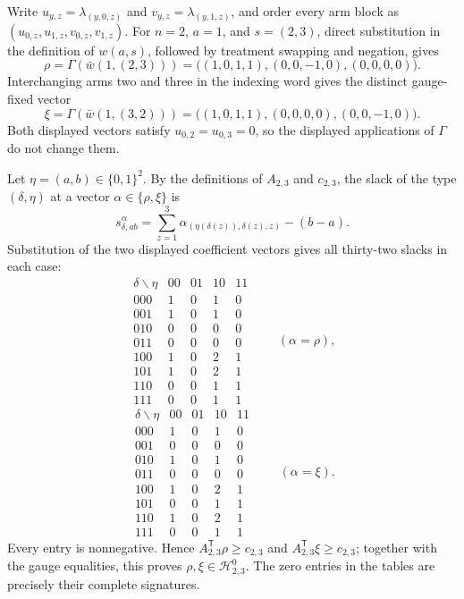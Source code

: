 Write \(u_{y,z}=\lambda_{(y,0,z)}\) and \(v_{y,z}=\lambda_{(y,1,z)}\), and order every arm block as \((u_{0,z},u_{1,z},v_{0,z},v_{1,z})\). For \(n=2\), \(a=1\), and \(s=(2,3)\), direct substitution in the definition of \(w(a,s)\), followed by treatment swapping and negation, gives
\[\rho=\Gamma(\bar w(1,(2,3)))=\bigl((1,0,1,1),(0,0,-1,0),(0,0,0,0)\bigr).\]
Interchanging arms two and three in the indexing word gives the distinct gauge-fixed vector
\[\xi=\Gamma(\bar w(1,(3,2)))=\bigl((1,0,1,1),(0,0,0,0),(0,0,-1,0)\bigr).\]
Both displayed vectors satisfy \(u_{0,2}=u_{0,3}=0\), so the displayed applications of \(\Gamma\) do not change them.

Let \(\eta=(a,b)\in\{0,1\}^2\). By the definitions of \(A_{2,3}\) and \(c_{2,3}\), the slack of the type \((\delta,\eta)\) at a vector \(\alpha\in\{\rho,\xi\}\) is
\[s^{\alpha}_{\delta,ab}=\sum_{z=1}^3\alpha_{(\eta(\delta(z)),\delta(z),z)}-(b-a).\]
Substitution of the two displayed coefficient vectors gives all thirty-two slacks in each case: 
\[\begin{array}{c|rrrr}\delta\backslash\eta&00&01&10&11\\ \hline 000&1&0&1&0\\ 001&1&0&1&0\\ 010&0&0&0&0\\ 011&0&0&0&0\\ 100&1&0&2&1\\ 101&1&0&2&1\\ 110&0&0&1&1\\ 111&0&0&1&1\end{array}\qquad(\alpha=\rho),\]
\[\begin{array}{c|rrrr}\delta\backslash\eta&00&01&10&11\\ \hline 000&1&0&1&0\\ 001&0&0&0&0\\ 010&1&0&1&0\\ 011&0&0&0&0\\ 100&1&0&2&1\\ 101&0&0&1&1\\ 110&1&0&2&1\\ 111&0&0&1&1\end{array}\qquad(\alpha=\xi).\]
Every entry is nonnegative. Hence \(A_{2,3}^{\mathsf T}\rho\ge c_{2,3}\) and \(A_{2,3}^{\mathsf T}\xi\ge c_{2,3}\); together with the gauge equalities, this proves \(\rho,\xi\in\mathcal H^0_{2,3}\). The zero entries in the tables are precisely their complete signatures.

